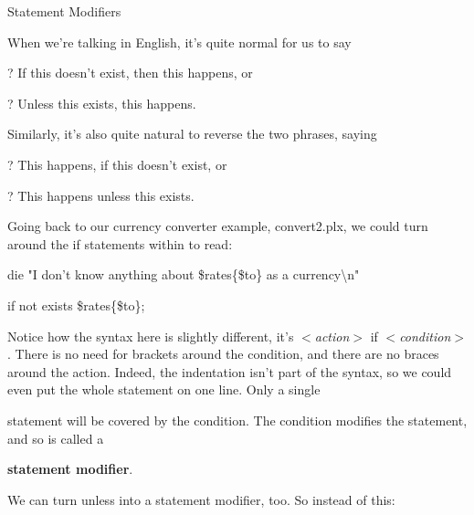 \documentclass[a4paper,11pt]{book}
\begin{document}
\noindent 

\noindent Statement Modifiers

\noindent 

\noindent When we're talking in English, it's quite normal for us to say

\noindent 

\noindent ? If this doesn't exist, then this happens, or

\noindent 

\noindent ? Unless this exists, this happens.

\noindent 

\noindent 

\noindent Similarly, it's also quite natural to reverse the two phrases, saying

\noindent 

\noindent ? This happens, if this doesn't exist, or

\noindent 

\noindent ? This happens unless this exists.

\noindent 

\noindent 

\noindent Going back to our currency converter example, convert2.plx, we could turn around the if statements within to read:

\noindent 

\noindent die "I don't know anything about \$rates\{\$to\} as a currency\textbackslash n"

\noindent if not exists \$rates\{\$to\};

\noindent 

\noindent Notice how  the syntax  here is  slightly  different,  it's  \textit{$<$action$>$ }if \textit{$<$condition$>$}.  There  is  no  need for brackets around the condition,  and  there  are  no  braces  around  the  action.  Indeed,  the  indentation isn't  part of the syntax,  so  we  could  even  put  the  whole  statement  on  one line.  Only  a  single

\noindent statement will be covered by  the  condition.  The  condition  modifies  the  statement,  and  so  is  called  a

\noindent \textbf{statement modifier}.

\noindent 

\noindent We can turn unless into a statement modifier, too. So instead of this:

\noindent 

\noindent 
\end{document}
